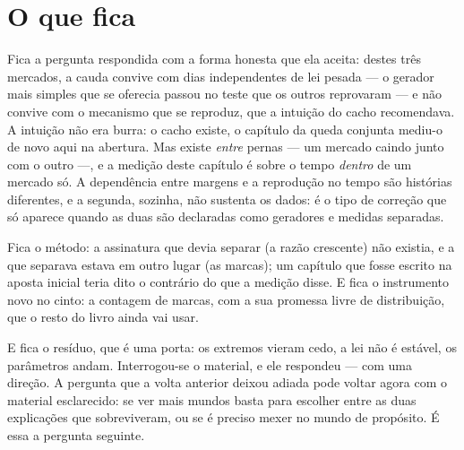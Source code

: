 \section{O que fica}

Fica a pergunta respondida com a forma honesta que ela aceita: destes três mercados, a cauda
convive com dias independentes de lei pesada --- o gerador mais simples que se oferecia passou no
teste que os outros reprovaram --- e não convive com o mecanismo que se reproduz, que a intuição
do cacho recomendava. A intuição não era burra: o cacho existe, o capítulo da queda conjunta
mediu-o de novo aqui na abertura. Mas existe \emph{entre} pernas --- um mercado caindo junto com o
outro ---, e a medição deste capítulo é sobre o tempo \emph{dentro} de um mercado só. A dependência
entre margens e a reprodução no tempo são histórias diferentes, e a segunda, sozinha, não sustenta
os dados: é o tipo de correção que só aparece quando as duas são declaradas como geradores e
medidas separadas.

Fica o método: a assinatura que devia separar (a razão crescente) não existia, e a que separava
estava em outro lugar (as marcas); um capítulo que fosse escrito na aposta inicial teria dito o
contrário do que a medição disse. E fica o instrumento novo no cinto: a contagem de marcas, com a
sua promessa livre de distribuição, que o resto do livro ainda vai usar.

E fica o resíduo, que é uma porta: os extremos vieram cedo, a lei não é estável, os parâmetros
andam. Interrogou-se o material, e ele respondeu --- com uma direção. A pergunta que a volta
anterior deixou adiada pode voltar agora com o material esclarecido: se ver mais mundos basta para
escolher entre as duas explicações que sobreviveram, ou se é preciso mexer no mundo de propósito.
É essa a pergunta seguinte.

